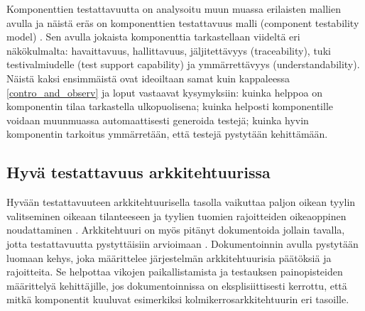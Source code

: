 \documentclass[finnish]{tktltiki2}
\theoremstyle{definition}
\theoremstyle{remark}
\begin{document}
Komponenttien testattavuutta on analysoitu muun muassa erilaisten mallien avulla ja näistä eräs on komponenttien testattavuus malli (component testability model) \citep[s. 6]{gao_component_2005}. Sen avulla jokaista komponenttia tarkastellaan viideltä eri näkökulmalta: havaittavuus, hallittavuus, jäljitettävyys (traceability), tuki testivalmiudelle (test support capability) ja ymmärrettävyys (understandability). Näistä kaksi ensimmäistä ovat ideoiltaan samat kuin kappaleessa \ref{contro_and_observ} ja loput vastaavat kysymyksiin: kuinka helppoa on komponentin tilaa tarkastella ulkopuolisena; kuinka helposti komponentille voidaan muunmuassa automaattisesti generoida testejä; kuinka hyvin komponentin tarkoitus ymmärretään, että testejä pystytään kehittämään.




 

\subsection{Hyvä testattavuus arkkitehtuurissa}



Hyvään testattavuuteen arkkitehtuurisella tasolla vaikuttaa paljon oikean tyylin valitseminen oikeaan tilanteeseen ja tyylien tuomien rajoitteiden oikeaoppinen noudattaminen \citep[s. 66]{Eickelmann:1996:MOS:243327.243602}. Arkkitehtuuri on myös pitänyt dokumentoida jollain tavalla, jotta testattavuutta pystyttäisiin arvioimaan \citep[s. 6]{mari_impact_2003}. Dokumentoinnin avulla pystytään luomaan kehys, joka määrittelee järjestelmän arkkitehtuurisia päätöksiä ja rajoitteita. Se helpottaa vikojen paikallistamista ja testauksen painopisteiden määrittelyä kehittäjille, jos dokumentoinnissa on eksplisiittisesti kerrottu, että mitkä komponentit kuuluvat esimerkiksi kolmikerrosarkkitehtuurin eri tasoille. 
\end{document}
